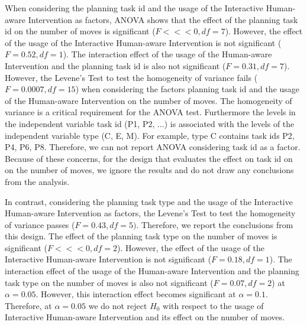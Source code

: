 When considering the planning task id and the usage of the Interactive Human-aware Intervention as factors, ANOVA shows that the effect of the planning task id on the number of moves is significant ($F<<<0, df=7$).
However, the effect of the usage of the Interactive Human-aware Intervention is not significant ($F=0.52, df=1$).
The interaction effect of the usage of the Human-aware Intervention and the planning task id is also not significant ($F=0.31, df=7$).
However, the Levene's Test to test the homogeneity of variance fails ($F=0.0007, df=15$) when considering the factors planning task id and the usage of the Human-aware Intervention on the number of moves.
The homogeneity of variance is a critical requirement for the ANOVA test.
Furthermore the levels in the independent variable task id (P1, P2, $\ldots$) is associated with the levels of the independent variable type (C, E, M).
For example, type C contains task ids P2, P4, P6, P8.
Therefore, we can not report ANOVA considering task id as a factor.
Because of these concerns, for the design that evaluates the effect on task id on on the number of moves, we ignore the results and do not draw any conclusions from the analysis.

In contrast, considering the planning task type and the usage of the Interactive Human-aware Intervention as factors, the Levene's Test to test the homogeneity of variance passes ($F=0.43, df=5)$.
Therefore, we report the conclusions from this design.
The effect of the planning task type on the number of moves is significant ($F<<<0, df=2$).
However, the effect of the usage of the Interactive Human-aware Intervention is not significant ($F=0.18, df=1$).
The interaction effect of the usage of the Human-aware Intervention and the planning task type on the number of moves is also not significant ($F=0.07, df=2$) at $\alpha=0.05$.
However, this interaction effect becomes significant at $\alpha=0.1$.
Therefore, at $\alpha=0.05$ we do not reject $H_0$ with respect to the usage of Interactive Human-aware Intervention and its effect on the number of moves.


